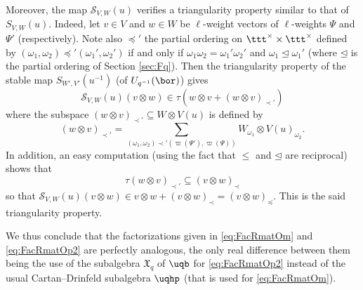 \documentclass[11pt]{amsart}
\theoremstyle{definition}
\theoremstyle{remark}
\numberwithin{equation}{section}
\begin{document}
Moreover, the map $\mathcal{S}_{V,W}(u)$ verifies a triangularity property similar to that of $S_{V,W}(u)$. Indeed, let $v \in V$ and $w\in W$ be $\ell$-weight vectors of $\ell$-weights $\Psi$ and $\Psi'$ (respectively). Note also $\preceq'$ the partial ordering on $\ttt^{\times}\times \ttt^{\times}$ defined by $(\omega_1,\omega_2)\preceq'(\omega_1',\omega_2')$ if and only if $\omega_1\omega_2=\omega_1'\omega_2'$ and $\omega_1\unlhd \omega_1'$ (where $\unlhd$ is the partial ordering of Section \ref{sec:Fq}). Then the triangularity property of the stable map $S_{W',V'}(u^{-1})$ (of $U_{q^{-1}}(\bor)$) gives 
$$ \mathcal{S}_{V,W}(u)(v\otimes w) \in \tau(w\otimes v+(w\otimes v)_{\prec'})$$
where the subspace $(w\otimes v)_{\prec'}\subseteq W\otimes V(u)$ is defined by $$(w\otimes v)_{\prec'} = \sum_{(\omega_1,\omega_2)\prec'(\varpi(\Psi'),\varpi(\Psi))}W_{\omega_1}\otimes V(u)_{\omega_2}.$$
In addition, an easy computation (using the fact that $\leq$ and $\unlhd$ are reciprocal) shows that $$ \tau(w\otimes v)_{\prec'}\subseteq (v\otimes w)_{\prec}$$
so that $\mathcal{S}_{V,W}(u)(v\otimes w) \in v\otimes w+(v\otimes w)_{\prec}=(v\otimes w)_{\preceq}$. This is the said triangularity property. \par We thus conclude that the factorizations given in \eqref{eq:FacRmatOm} and \eqref{eq:FacRmatOp2} are perfectly analogous, the only real difference between them being the use of the subalgebra $\mathfrak{X}_q$ of $\uqb$ for \eqref{eq:FacRmatOp2} instead of the usual Cartan--Drinfeld subalgebra $\uqhp$ (that is used for \eqref{eq:FacRmatOm}). 
\end{document}

